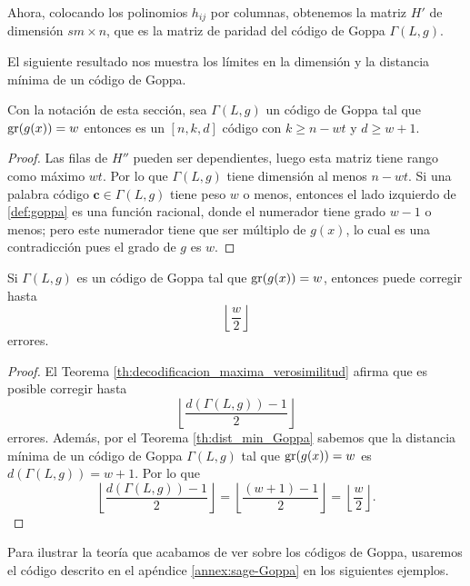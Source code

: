Ahora, colocando los polinomios $h_{ij}$ por columnas, obtenemos la matriz $H'$ de dimensión $sm \times n$, que es la matriz de paridad del código de Goppa $\Gamma(L, g)$.

El siguiente resultado nos muestra los límites en la dimensión y la distancia mínima de un código de Goppa.

\begin{theorem}
    \label{th:dist_min_Goppa}
    Con la notación de esta sección, sea $\Gamma(L,g)$ un código de Goppa tal que $\operatorname{gr}(g(x)) = w$ entonces es un $[n, k, d]$ código con $k \geq n - wt$ y $d \geq w + 1$.
\end{theorem}

\begin{proof}
    Las filas de $H''$ pueden ser dependientes, luego esta matriz tiene rango como máximo $wt$. Por lo que $\Gamma(L,g)$ tiene dimensión al menos $n - wt$. Si una palabra código $\textbf{c} \in \Gamma(L,g)$ tiene peso $w$ o menos, entonces el lado izquierdo de \ref{def:goppa} es una función racional, donde el numerador tiene grado $w - 1$ o menos; pero este numerador tiene que ser múltiplo de $g(x)$, lo cual es una contradicción pues el grado de $g$ es $w$.
\end{proof}

\begin{corollary}
    Si $\Gamma(L,g)$ es un código de Goppa tal que $\operatorname{gr}(g(x)) = w$, entonces puede corregir hasta
    \[
        \left\lfloor \frac{w}{2} \right\rfloor
    \]
    errores.
\end{corollary}

\begin{proof}
    El Teorema \ref{th:decodificacion_maxima_verosimilitud} afirma que es posible corregir hasta 
    \[
        \left\lfloor \frac{d(\Gamma(L,g)) - 1}{2} \right\rfloor
    \]
    errores. Además, por el Teorema \ref{th:dist_min_Goppa} sabemos que la distancia mínima de un código de Goppa $\Gamma(L,g)$ tal que $\operatorname{gr}(g(x)) = w$ es $d(\Gamma(L,g)) = w + 1$. Por lo que
    \[
        \left\lfloor \frac{d(\Gamma(L,g)) - 1}{2} \right\rfloor = \left\lfloor \frac{(w + 1) - 1}{2} \right\rfloor = \left\lfloor \frac{w}{2} \right\rfloor .
    \]
\end{proof}

Para ilustrar la teoría que acabamos de ver sobre los códigos de Goppa, usaremos el código descrito en el apéndice \ref{annex:sage-Goppa} en los siguientes ejemplos.

